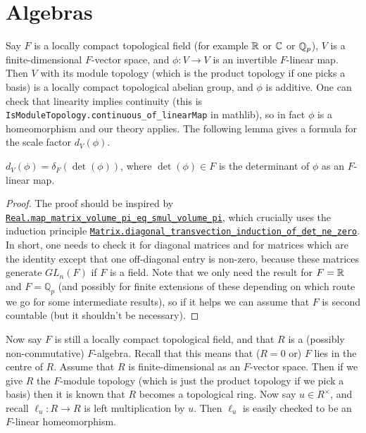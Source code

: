 \section{Algebras}

  Say $F$ is a locally compact topological field (for example $\mathbb{R}$ or $\mathbb{C}$ or $\mathbb{Q}_p$), $V$
  is a finite-dimensional $F$-vector space, and $\phi:V\to V$ is an invertible $F$-linear map.
  Then $V$ with its module topology (which is the product topology if one picks a basis)
  is a locally compact topological abelian group, and $\phi$ is additive.
  One can check that linearity implies continuity (this is {\tt IsModuleTopology.continuous\_of\_linearMap} in mathlib),
  so in fact $\phi$ is a homeomorphism
  and our theory applies. The following lemma gives a formula for the scale factor $d_V(\phi)$.

\begin{lemma}
  \label{MeasureTheory.addEquivAddHaarChar_eq_ringHaarChar_det}
  \leanok
  $d_V(\phi)=\delta_F(\det(\phi))$, where $\det(\phi)\in F$ is the determinant of $\phi$ as an $F$-linear map.
\end{lemma}
\begin{proof}
The proof should be inspired by \href{https://leanprover-community.github.io/mathlib4\_docs/Mathlib/MeasureTheory/Measure/Lebesgue/Basic.html\#Real.map\_matrix\_volume\_pi\_eq\_smul\_volume\_pi}{\tt Real.map\_matrix\_volume\_pi\_eq\_smul\_volume\_pi},
which crucially uses the induction principle \href{https://leanprover-community.github.io/mathlib4\_docs/Mathlib/LinearAlgebra/Matrix/Transvection.html\#Matrix.diagonal\_transvection\_induction\_of\_det\_ne\_zero}{\tt Matrix.diagonal\_transvection\_induction\_of\_det\_ne\_zero}.
In short, one needs to check it for diagonal matrices and for matrices which are the identity
except that one off-diagonal entry is non-zero, because these matrices generate $GL_n(F)$
if $F$ is a field. Note that we only need the result for $F=\mathbb{R}$
and $F=\mathbb{Q}_p$ (and possibly for finite extensions of these depending on which route
we go for some intermediate results), so if it helps we can assume that $F$ is second countable
(but it shouldn't be necessary).
\end{proof}

Now say $F$ is still a locally compact topological field, and that $R$ is a (possibly
non-commutative) $F$-algebra. Recall that this means that ($R=0$ or) $F$ lies in the centre of $R$.
Assume that $R$ is finite-dimensional as an $F$-vector space. Then if we give $R$ the
$F$-module topology (which is just the product topology if we pick a basis) then it is known
that $R$ becomes a topological ring. Now say $u\in R^\times$, and
recall $\ell_u:R\to R$ is left multiplication by $u$. Then $\ell_u$ is easily checked to be
an $F$-linear homeomorphism.

